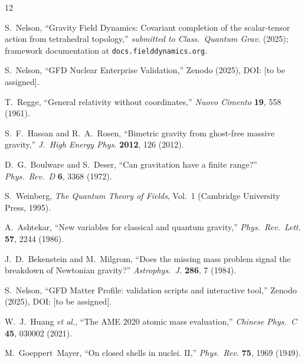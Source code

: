 \documentclass[twocolumn]{iopjournal}
\begin{document}
\begin{thebibliography}{12}

S.~Nelson,
``Gravity Field Dynamics: Covariant completion of the
  scalar-tensor action from tetrahedral topology,''
  \textit{submitted to Class.\ Quantum Grav.} (2025);
  framework documentation at \texttt{docs.fielddynamics.org}.

S.~Nelson,
``GFD Nuclear Enterprise Validation,''
  Zenodo (2025), DOI: [to be assigned].

T.~Regge,
``General relativity without coordinates,''
  \textit{Nuovo Cimento} \textbf{19}, 558 (1961).

S.~F.~Hassan and R.~A.~Rosen,
``Bimetric gravity from ghost-free massive gravity,''
  \textit{J.\ High Energy Phys.} \textbf{2012}, 126 (2012).

D.~G.~Boulware and S.~Deser,
``Can gravitation have a finite range?''
  \textit{Phys.\ Rev.\ D} \textbf{6}, 3368 (1972).

S.~Weinberg,
\textit{The Quantum Theory of Fields}, Vol.~1
  (Cambridge University Press, 1995).

A.~Ashtekar,
``New variables for classical and quantum gravity,''
  \textit{Phys.\ Rev.\ Lett.} \textbf{57}, 2244 (1986).

J.~D.~Bekenstein and M.~Milgrom,
``Does the missing mass problem signal the breakdown of
  Newtonian gravity?''
  \textit{Astrophys.\ J.} \textbf{286}, 7 (1984).

S.~Nelson,
``GFD Matter Profile: validation scripts and interactive tool,''
  Zenodo (2025), DOI: [to be assigned].

W.~J.~Huang \textit{et al.},
``The AME 2020 atomic mass evaluation,''
  \textit{Chinese Phys.\ C} \textbf{45}, 030002 (2021).

M.~Goeppert~Mayer,
``On closed shells in nuclei. II,''
  \textit{Phys.\ Rev.} \textbf{75}, 1969 (1949).

\end{thebibliography}


\onecolumn
\end{document}

